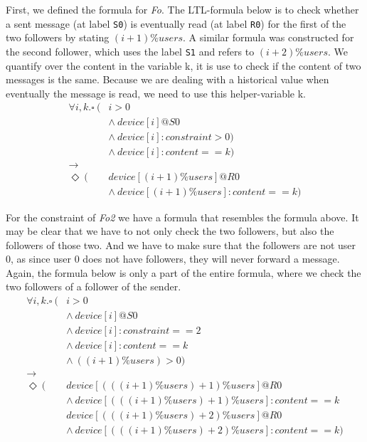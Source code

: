\documentclass[9pt,a4paper]{article}
\begin{document}
	First, we defined the formula for \textit{Fo}. The LTL-formula below is to check whether a sent message (at label \texttt{S0}) is eventually read (at label \texttt{R0}) for the first of the two followers by stating $(i+1) \% users$. A similar formula was constructed for the second follower, which uses the label \texttt{S1} and refers to  $(i+2) \% users$. We quantify over the content in the variable k, it is use to check if the content of two messages is the same. Because we are dealing with a historical value when eventually the message is read, we need to use this helper-variable k.
	\begin{align*}
	\forall i, k. 
	\square\ ( & i > 0 \\
	& \wedge\ device[i]@S0 \\
	& \wedge\ device[i]:constraint > 0 ) \\
	& \wedge\ device[i]:content == k ) \\
	\rightarrow & \\
	\Diamond\ ( & device[(i+1) \%  users]@R0 \\
	& \wedge\ device[(i+1) \% users]:content == k)
	\end{align*}
	
	For the constraint of \textit{Fo2} we have a formula that resembles the formula above. It may be clear that we have to not only check the two followers, but also the followers of those two.
	And we have to make sure that the followers are not user 0, as since user 0 does not have followers, they will never forward a message. Again, the formula below is only a part of the entire formula, where we check the two followers of a follower of the sender.
	\begin{align*}
	\forall i, k. 
	\square\ ( & i > 0 \\
	& \wedge\ device[i]@S0 \\
	& \wedge\ device[i]:constraint == 2 \\
	& \wedge\ device[i]:content == k \\
	& \wedge\ ((i+1)\%users) > 0) \\
	\rightarrow\ & \\
	\Diamond\ ( & device[(((i+1) \% users)+1) \%  users]@R0 \\
	& \wedge\ device[(((i+1) \% users)+1) \%  users]:content == k \\
	& device[(((i+1) \% users)+2) \%  users]@R0 \\
	& \wedge\ device[(((i+1) \% users)+2) \%  users]:content == k)
	\end{align*}
	
\end{document}
